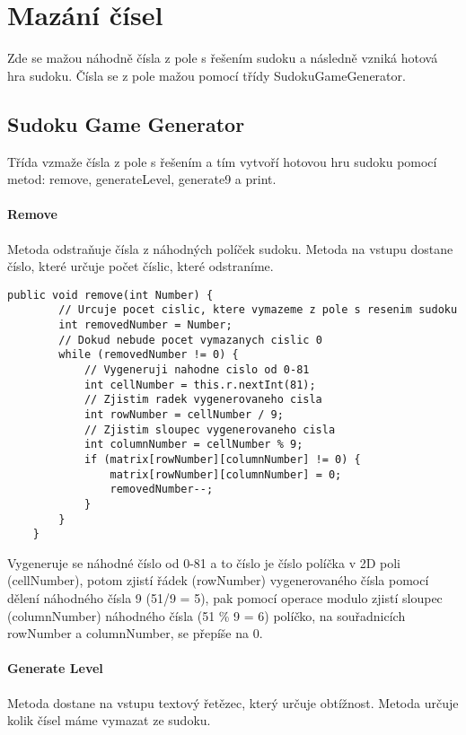 \chapter{Mazání čísel}
Zde se mažou náhodně čísla z pole s řešením sudoku a následně vzniká hotová hra sudoku. Čísla se z pole mažou pomocí třídy SudokuGameGenerator. 

\section{Sudoku Game Generator}
Třída vzmaže čísla z pole s řešením a tím vytvoří hotovou hru sudoku pomocí metod: remove, generateLevel, generate9 a print.

\label{Remove}\subsubsection{Remove}
Metoda odstraňuje čísla z náhodných políček sudoku. Metoda na vstupu dostane číslo, které určuje počet číslic, které odstraníme.

\begin{small}
\begin{lstlisting}
public void remove(int Number) {
        // Urcuje pocet cislic, ktere vymazeme z pole s resenim sudoku
        int removedNumber = Number;
        // Dokud nebude pocet vymazanych cislic 0
        while (removedNumber != 0) {
            // Vygeneruji nahodne cislo od 0-81
            int cellNumber = this.r.nextInt(81);
            // Zjistim radek vygenerovaneho cisla
            int rowNumber = cellNumber / 9;
            // Zjistim sloupec vygenerovaneho cisla
            int columnNumber = cellNumber % 9;
            if (matrix[rowNumber][columnNumber] != 0) {
                matrix[rowNumber][columnNumber] = 0;
                removedNumber--;
            }
        }
    }
\end{lstlisting}
\end{small}

Vygeneruje se náhodné číslo od 0-81 a to číslo je číslo políčka v 2D poli (cellNumber), potom zjistí řádek (rowNumber) vygenerovaného čísla pomocí dělení náhodného čísla 9 (51/9 = 5), pak pomocí operace modulo zjistí sloupec (columnNumber) náhodného čísla (51 \% 9 = 6) políčko, na souřadnicích rowNumber a columnNumber, se přepíše na 0.

\label{GenerateLevel}\subsubsection{Generate Level}
Metoda dostane na vstupu textový řetězec, který určuje obtížnost. Metoda určuje kolik čísel máme vymazat ze sudoku.

